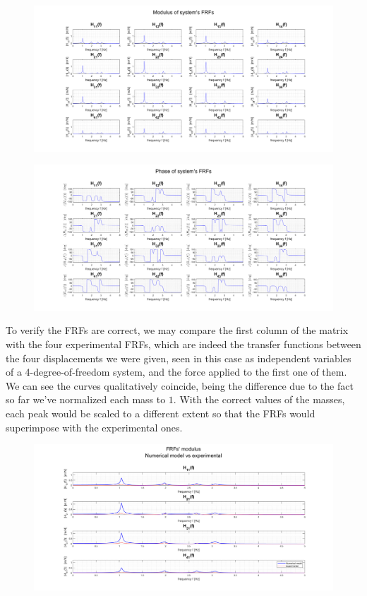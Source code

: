 \documentclass[a4paper,12pt,oneside]{article}
\begin{document}
\begin{figure}[H]
	\hspace{-70pt}
	\includegraphics[scale=0.4]{frfs_modulus}
\end{figure}

\begin{figure}[H]
	\hspace{-70pt}
	\includegraphics[scale=0.4]{frfs_phase}
\end{figure}

To verify the FRFs are correct, we may compare the first column of the matrix with the four experimental FRFs, which are indeed the transfer functions between the four displacements we were given, seen in this case as independent variables of a 4-degree-of-freedom system, and the force applied to the first one of them. We can see the curves qualitatively coincide, being the difference due to the fact so far we've normalized each mass to $ 1 $. With the correct values of the masses, each peak would be scaled to a different extent so that the FRFs would superimpose with the experimental ones.

\begin{figure}[H]
	\hspace{-70pt}
	\includegraphics[scale=0.4]{frfs_num_vs_exp_modulus}
\end{figure}
\end{document}
